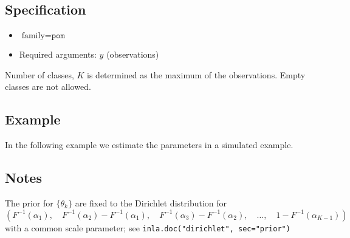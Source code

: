 \documentclass[a4paper,11pt]{article}
\begin{document}
\subsection*{Specification}

\begin{itemize}
\item $\text{family}=\texttt{pom}$
\item Required arguments: $y$ (observations)
\end{itemize}
Number of classes, $K$ is determined as the maximum of the
observations. Empty classes are not allowed.

\subsection*{Example}

In the following example we estimate the parameters in a simulated
example.
{\small

}

\subsection*{Notes}

The prior for $\{\theta_k\}$ are fixed to the Dirichlet distribution
for
\begin{displaymath}
    \left(F^{-1}(\alpha_1),\quad
    F^{-1}(\alpha_2)- F^{-1}(\alpha_1),\quad
    F^{-1}(\alpha_3)- F^{-1}(\alpha_2),\quad
    \ldots,\quad
    1-F^{-1}(\alpha_{K-1})\right)
\end{displaymath}    
with a common scale parameter; see \texttt{inla.doc("dirichlet", sec="prior")}
\end{document}
